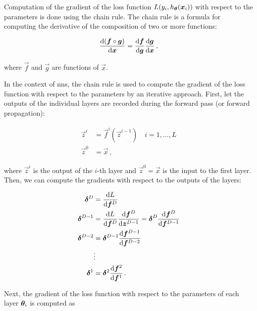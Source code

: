 Computation of the gradient of the loss function $L(y_i, h_{{\boldsymbol{\theta}}}({\boldsymbol{x}}_i))$ with respect to the parameters \nnparams
is done using the chain rule. The chain rule is a formula for computing the derivative of the composition of two or more
functions:

\begin{equation}
    \dv{(\vec{f} \circ \vec{g})}{\vec{x}} = \dv{\vec{f}}{\vec{g}} \dv{\vec{g}}{\vec{x}}\,,
\end{equation}

where $\vec{f}$ and $\vec{g}$ are functions of $\vec{x}$.

In the context of \glspl{nn}, the chain rule is used to compute the gradient of the loss function with respect to the
parameters \nnparams by an iterative approach. First, let the outputs of the individual layers are recorded during the
forward pass (or forward propagation):

\begin{align}
    \vec{z}^i & = \vec{f}^i(\vec{z}^{i-1}) \quad i = 1, \dots, L \\
    \vec{z}^0 & = \vec{x}\,,
\end{align}

where $\vec{z}^i$ is the output of the $i$-th layer and $\vec{z}^0 = \vec{x}$ is the input to the first layer. Then, we
can compute the gradients with respect to the outputs of the layers:

\begin{align}
    \vec{\delta}^D     & = \dv{L}{\vec{f}^D}                                                                              \\
    \vec{\delta}^{D-1} & = \dv{L}{\vec{f}^D} \dv{\vec{f}^D}{\vec{z}^{D-1}} = \vec{\delta}^D \dv{\vec{f}^D}{\vec{f}^{D-1}} \\
    \vec{\delta}^{D-2} & = \vec{\delta}^{D-1} \dv{\vec{f}^{D-1}}{\vec{f}^{D-2}}                                           \\
                       & \vdots \nonumber                                                                                 \\
    \vec{\delta}^1     & = \vec{\delta}^2 \dv{\vec{f}^2}{\vec{f}^1}\,.
\end{align}

Next, the gradient of the loss function with respect to the parameters of each layer ${\boldsymbol{\theta}}_i$ is computed as


